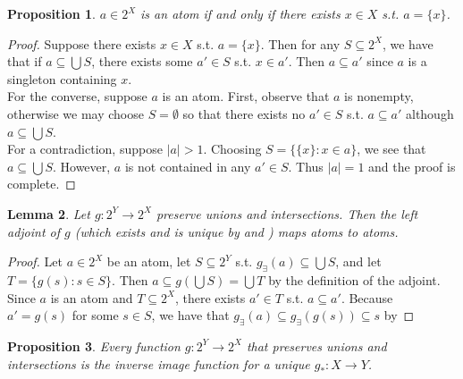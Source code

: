 \documentclass{article}
\newtheorem{proposition}{Proposition}[section]
\newtheorem{lemma}[proposition]{Lemma}
\numberwithin{equation}{section}
\begin{document}
\begin{proposition}\label{prop:powset-atoms-are-singletons}
$a \in 2^X$ is an atom if and only if there exists $x \in X$ s.t. $a = \{x\}$.
\end{proposition}

\begin{proof}
Suppose there exists $x \in X$ s.t. $a = \{x\}$. Then for any $S \subseteq 2^X$, we have that if $a \subseteq \bigcup S$, there exists some $a' \in S$ s.t. $x \in a'$. Then $a \subseteq a'$ since $a$ is a singleton containing $x$. \\ 

For the converse, suppose $a$ is an atom. First, observe that $a$ is nonempty, otherwise we may choose $S = \emptyset$ so that there exists no $a' \in S$ s.t. $a \subseteq a'$ although $a \subseteq \bigcup S$. \\

For a contradiction, suppose $|a| > 1$. Choosing $S = \{\{x\} : x \in a\}$, we see that $a \subseteq \bigcup S$. However, $a$ is not contained in any $a' \in S$. Thus $|a| = 1$ and the proof is complete.
\end{proof}

\begin{lemma}\label{lem:left-adjoint-maps-atoms-to-atoms}
Let $g : 2^Y \to 2^X$ preserve unions and intersections. Then the left adjoint of $g$ (which exists and is unique by  and ) maps atoms to atoms. 
\end{lemma}

\begin{proof}
Let $a \in 2^X$ be an atom, let $S \subseteq 2^Y$ s.t. $g_\exists(a) \subseteq \bigcup S$, and let $T = \{g(s) : s \in S\}$. Then $a \subseteq g(\bigcup S) = \bigcup T$ by the definition of the adjoint. Since $a$ is an atom and $T \subseteq 2^X$, there exists $a' \in T$ s.t. $a \subseteq a'$. Because $a' = g(s)$ for some $s \in S$, we have that $g_\exists(a) \subseteq g_\exists(g(s)) \subseteq s$ by 
\end{proof}

\begin{proposition} \label{prop:powset-morphism-is-inv-image}
Every function $g : 2^Y \to 2^X$ that preserves unions and intersections is the inverse image function for a unique $g_* : X \to Y$. 
\end{proposition}
\end{document}
